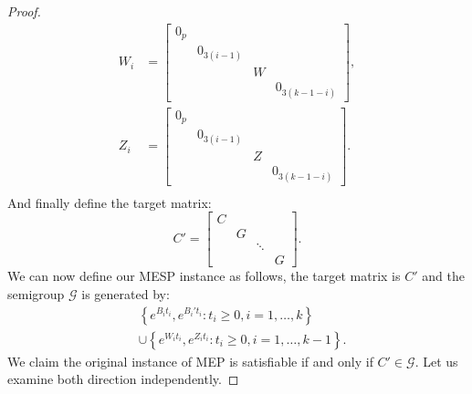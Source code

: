 \begin{proof}
\begin{align*}
W_i&=\begin{bmatrix}0_p&&&\\&0_{3(i-1)}&&\\&&W&\\&&&0_{3(k-1-i)}\end{bmatrix},\\
Z_i&=\begin{bmatrix}0_p&&&\\&0_{3(i-1)}&&\\&&Z&\\&&&0_{3(k-1-i)}\end{bmatrix}.\\
\end{align*}
And finally define the target matrix:
\[C'=\begin{bmatrix}C&&&\\&G&&\\&&\ddots&\\&&&G\end{bmatrix}.\]
We can now define our MESP instance as follows, the target matrix is $C'$ and the semigroup $\mathcal{G}$
is generated by:
\begin{align*}
&\left\{e^{B_it_i},e^{B_i't_i}:t_i\geqslant0,i=1,\ldots,k\right\}\\
&\cup\left\{e^{W_it_i},e^{Z_it_i}:t_i\geqslant0,i=1,\ldots,k-1\right\}.
\end{align*}
We claim the original instance of MEP is satisfiable if and only if $C'\in\mathcal{G}$.
Let us examine both direction independently.


\end{proof}
